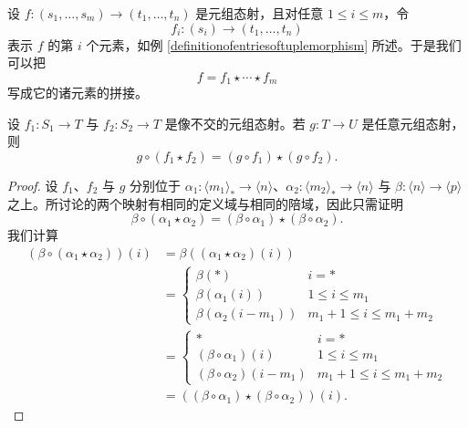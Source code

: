 \begin{example}
设 $f:(s_1,\dots,s_m) \to (t_1,\dots,t_n)$ 是元组态射，且对任意 $1 \leq i \leq m$，令
\[f_i:(s_i) \to (t_1,\dots,t_n)\]
表示 $f$ 的第 $i$ 个元素，如例 \ref{definitionofentriesoftuplemorphism} 所述。于是我们可以把
\[
f = f_1 \star \cdots \star f_m
\]
写成它的诸元素的拼接。
\end{example}

\begin{lemma}\label{compositiondistributesoverconcatenation}
    设 $f_1:S_1 \to T$ 与 $f_2: S_2 \to T$ 是像不交的元组态射。若 $g:T \to U$ 是任意元组态射，则
    \[
    g \circ (f_1 \star f_2) = (g \circ f_1) \star (g \circ f_2).
    \]
\end{lemma}

\begin{proof}
    设 $f_1$、$f_2$ 与 $g$ 分别位于 $\alpha_1:\langle m_1 \rangle_* \to \langle n \rangle$、$\alpha_2:\langle m_2 \rangle_* \to \langle n \rangle$ 与 $\beta: \langle n \rangle \to \langle p \rangle$ 之上。所讨论的两个映射有相同的定义域与相同的陪域，因此只需证明
    \[
    \beta \circ (\alpha_1 \star \alpha_2) = (\beta \circ \alpha_1) \star (\beta \circ \alpha_2).
    \]
    我们计算
    \begin{align*}
        (\beta \circ (\alpha_1 \star \alpha_2))(i) & = \beta((\alpha_1 \star \alpha_2)(i))\\
        & = \begin{cases}
        \beta(*) & i = *\\
        \beta(\alpha_1(i)) & 1 \leq i \leq m_1 \\
        \beta (\alpha_2(i-m_1)) & m_1 + 1 \leq i \leq m_1 + m_2
        \end{cases}\\
        & = \begin{cases}
        * & i = *\\
        (\beta\circ \alpha_1)(i) & 1 \leq i \leq m_1 \\
        (\beta \circ \alpha_2)(i-m_1) & m_1 + 1 \leq i \leq m_1 + m_2
        \end{cases}\\
        & = ((\beta \circ \alpha_1)\star (\beta \circ \alpha_2))(i).
    \end{align*}
\end{proof}

